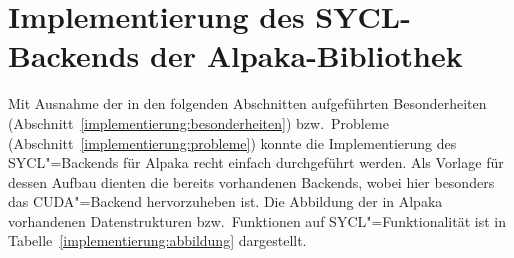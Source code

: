 \chapter{Implementierung des SYCL-Backends der Alpaka-Bibliothek}
\label{implementierung}

Mit Ausnahme der in den folgenden Abschnitten aufgeführten Besonderheiten
(Abschnitt~\ref{implementierung:besonderheiten}) bzw.\ Probleme
(Abschnitt~\ref{implementierung:probleme}) konnte die Implementierung des
SYCL"=Backends für Alpaka recht einfach durchgeführt werden. Als Vorlage für
dessen Aufbau dienten die bereits vorhandenen Backends, wobei hier besonders
das CUDA"=Backend hervorzuheben ist. Die Abbildung der in Alpaka vorhandenen
Datenstrukturen bzw.\ Funktionen auf SYCL"=Funktionalität ist in
Tabelle~\ref{implementierung:abbildung} dargestellt.

